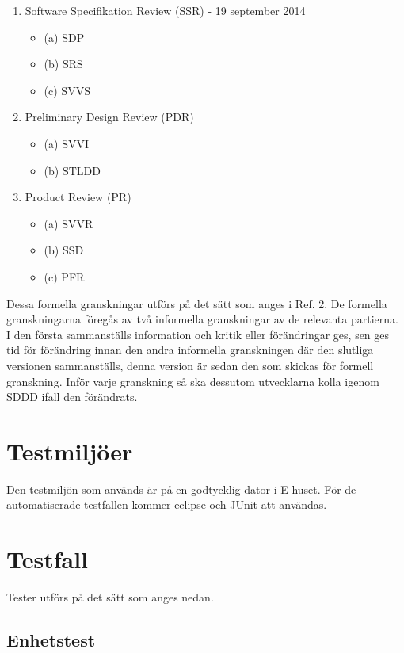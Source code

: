 \documentclass[a4paper]{article}
\begin{document}
\begin{enumerate}


\item Software Specifikation Review (SSR) - 19 september 2014
\begin{itemize}
\item [](a) SDP
\item [](b) SRS
\item [](c) SVVS
\end{itemize}


\item Preliminary Design Review (PDR)
\begin{itemize}
\item [](a) SVVI
\item [](b) STLDD
\end{itemize}


\item Product Review (PR)
\begin{itemize}
\item [](a) SVVR
\item [](b) SSD
\item [](c) PFR
\end{itemize}


\end{enumerate}

Dessa formella granskningar utförs på det sätt som anges i Ref. 2. De formella granskningarna föregås av två informella granskningar av de relevanta partierna. I den första sammanställs information och kritik eller förändringar ges, sen ges tid för förändring innan den andra informella granskningen där den slutliga versionen sammanställs, denna version är sedan den som skickas för formell granskning. Inför varje granskning så ska dessutom utvecklarna kolla igenom SDDD ifall den förändrats.


\section{Testmiljöer}

Den testmiljön som används är på en godtycklig dator i E-huset. För de automatiserade testfallen kommer eclipse och JUnit att användas.

\section{Testfall}

Tester utförs på det sätt som anges nedan.

\subsection{Enhetstest}
\end{document}
